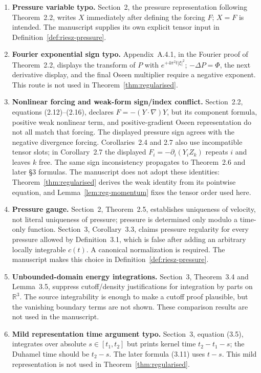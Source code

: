 \documentclass[11pt,reqno]{amsart}
\begin{document}
\begin{enumerate}
\item \textbf{Pressure variable typo.} Section~2, the pressure representation following Theorem~2.2, writes \(X\) immediately after defining the forcing \(F\); \(X=F\) is intended. The manuscript supplies its own explicit tensor input in Definition~\ref{def:riesz-pressure}.

\item \textbf{Fourier exponential sign typo.} Appendix~A.4.1, in the Fourier proof of Theorem~2.2, displays the transform of \(P\) with \(e^{+4\pi^2t|\xi|^2}\); \(-\Delta P=\Phi\), the next derivative display, and the final Oseen multiplier require a negative exponent. This route is not used in Theorem~\ref{thm:regularised}.

\item \textbf{Nonlinear forcing and weak-form sign/index conflict.} Section~2.2, equations (2.12)--(2.16), declares \(F=-(Y\cdot\nabla)Y\), but its component formula, positive weak nonlinear term, and positive-gradient Oseen representation do not all match that forcing. The displayed pressure sign agrees with the negative divergence forcing. Corollaries~2.4 and 2.7 also use incompatible tensor slots; in Corollary~2.7 the displayed \(F_i=-\partial_i(Y_iZ_k)\) repeats \(i\) and leaves \(k\) free. The same sign inconsistency propagates to Theorem~2.6 and later §3 formulas. The manuscript does not adopt these identities: Theorem~\ref{thm:regularised} derives the weak identity from its pointwise equation, and Lemma~\ref{lem:reg-momentum} fixes the tensor order used here.

\item \textbf{Pressure gauge.} Section~2, Theorem~2.5, establishes uniqueness of velocity, not literal uniqueness of pressure; pressure is determined only modulo a time-only function. Section~3, Corollary~3.3, claims pressure regularity for every pressure allowed by Definition~3.1, which is false after adding an arbitrary locally integrable \(c(t)\). A canonical normalization is required. The manuscript makes this choice in Definition~\ref{def:riesz-pressure}.


\item \textbf{Unbounded-domain energy integrations.} Section~3, Theorem~3.4 and Lemma~3.5, suppress cutoff/density justifications for integration by parts on \(\mathbb R^3\). The source integrability is enough to make a cutoff proof plausible, but the vanishing boundary terms are not shown. These comparison results are not used in the manuscript.

\item \textbf{Mild representation time argument typo.} Section~3, equation (3.5), integrates over absolute \(s\in[t_1,t_2]\) but prints kernel time \(t_2-t_1-s\); the Duhamel time should be \(t_2-s\). The later formula (3.11) uses \(t-s\). This mild representation is not used in Theorem~\ref{thm:regularised}.


\end{enumerate}
\end{document}

